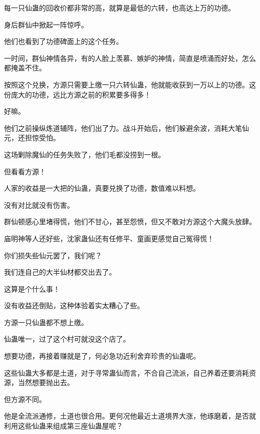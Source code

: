 \begin{this_body}
每一只仙蛊的回收价都非常的高，就算是最低的六转，也高达上万的功德。

身后群仙中掀起一阵惊呼。

他们也看到了功德碑面上的这个任务。

一时间，群仙神情各异，有的人脸上羡慕、嫉妒的神情，简直是喷涌而好处，怎么都掩盖不住。

按照这个兑换，方源只需要上缴一只六转仙蛊，他就能收获到一万以上的功德。这份庞大的功德，远比方源之前的积累要多得多！

好嘛。

他们之前操纵炼道辅阵，他们出了力。战斗开始后，他们躲避余波，消耗大笔仙元，还担惊受怕。

这场剿除魔仙的任务失败了，他们毛都没捞到一根。

但看看方源！

人家的收益是一大把的仙蛊，真要兑换了功德，数值难以料想。

没有对比就没有伤害。

群仙顿感心里堵得慌，他们不甘心，甚至怨愤，但又不敢对方源这个大魔头放肆。

庙明神等人还好些，沈家蛊仙还有任修平、童画更感觉自己冤得慌！

你们损失些仙元罢了，我们呢？

我们连自己的大半仙材都交出去了。

这算是个什么事！

没有收益还倒贴，这种体验着实太糟心了些。

方源一只仙蛊都不想上缴。

仙蛊唯一，过了这个村可就没这个店了。

想要功德，再接着赚就是了，何必急功近利舍弃珍贵的仙蛊呢。

这些仙蛊大多都是土道，对于寻常蛊仙而言，不合自己流派，自己养着还要消耗资源，当然想要抛出去。

但方源不同。

他是全流派通修，土道也很合用。更何况他最近土道境界大涨，他琢磨着，是否就利用这些仙蛊来组成第三座仙蛊屋呢？

\end{this_body}

